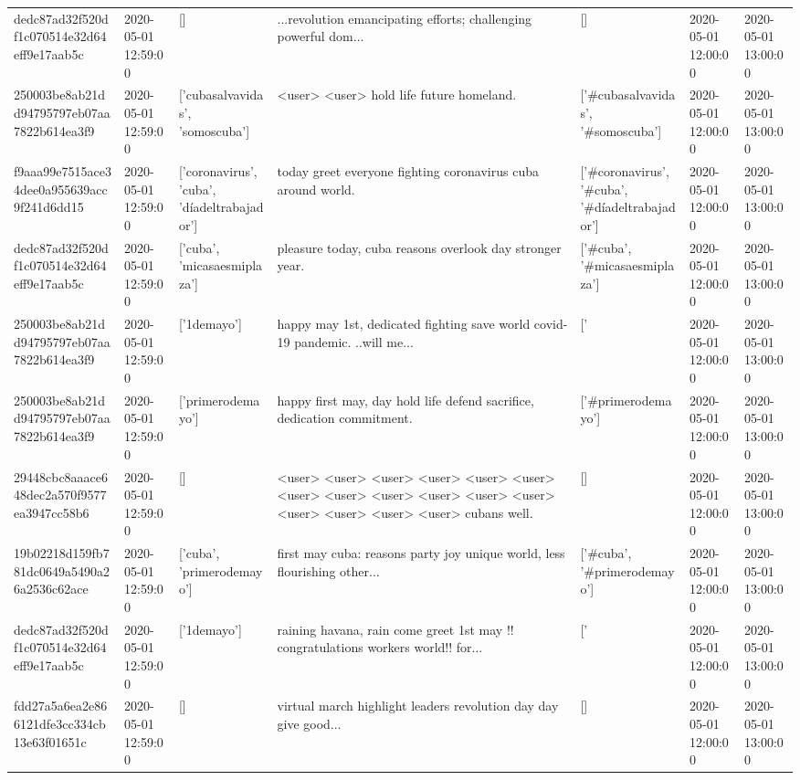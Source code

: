 \begin{tabular}{lllllll}
dedc87ad32f520df1c070514e32d64eff9e17aab5c & 2020-05-01 12:59:00 & [] & ...revolution emancipating efforts; challenging powerful dom... & [] & 2020-05-01 12:00:00 & 2020-05-01 13:00:00 \\
250003be8ab21dd94795797eb07aa7822b614ea3f9 & 2020-05-01 12:59:00 & ['cubasalvavidas', 'somoscuba'] & <user> <user> hold life future homeland. & ['#cubasalvavidas', '#somoscuba'] & 2020-05-01 12:00:00 & 2020-05-01 13:00:00 \\
f9aaa99e7515ace34dee0a955639acc9f241d6dd15 & 2020-05-01 12:59:00 & ['coronavirus', 'cuba', 'díadeltrabajador'] & today greet everyone fighting coronavirus cuba around world. & ['#coronavirus', '#cuba', '#díadeltrabajador'] & 2020-05-01 12:00:00 & 2020-05-01 13:00:00 \\
dedc87ad32f520df1c070514e32d64eff9e17aab5c & 2020-05-01 12:59:00 & ['cuba', 'micasaesmiplaza'] & pleasure today, cuba reasons overlook day stronger year. & ['#cuba', '#micasaesmiplaza'] & 2020-05-01 12:00:00 & 2020-05-01 13:00:00 \\
250003be8ab21dd94795797eb07aa7822b614ea3f9 & 2020-05-01 12:59:00 & ['1demayo'] & happy may 1st, dedicated fighting save world covid-19 pandemic. ..will me... & ['#1demayo'] & 2020-05-01 12:00:00 & 2020-05-01 13:00:00 \\
250003be8ab21dd94795797eb07aa7822b614ea3f9 & 2020-05-01 12:59:00 & ['primerodemayo'] & happy first may, day hold life defend sacrifice, dedication commitment. & ['#primerodemayo'] & 2020-05-01 12:00:00 & 2020-05-01 13:00:00 \\
29448cbc8aaace648dec2a570f9577ea3947cc58b6 & 2020-05-01 12:59:00 & [] & <user> <user> <user> <user> <user> <user> <user> <user> <user> <user> <user> <user> <user> <user> <user> <user> cubans well. & [] & 2020-05-01 12:00:00 & 2020-05-01 13:00:00 \\
19b02218d159fb781dc0649a5490a26a2536c62ace & 2020-05-01 12:59:00 & ['cuba', 'primerodemayo'] & first may cuba: reasons party joy unique world, less flourishing other... & ['#cuba', '#primerodemayo'] & 2020-05-01 12:00:00 & 2020-05-01 13:00:00 \\
dedc87ad32f520df1c070514e32d64eff9e17aab5c & 2020-05-01 12:59:00 & ['1demayo'] & raining havana, rain come greet 1st may !! congratulations workers world!! for... & ['#1demayo'] & 2020-05-01 12:00:00 & 2020-05-01 13:00:00 \\
fdd27a5a6ea2e866121dfe3cc334cb13e63f01651c & 2020-05-01 12:59:00 & [] & virtual march highlight leaders revolution day day give good... & [] & 2020-05-01 12:00:00 & 2020-05-01 13:00:00 \\

\end{tabular}
